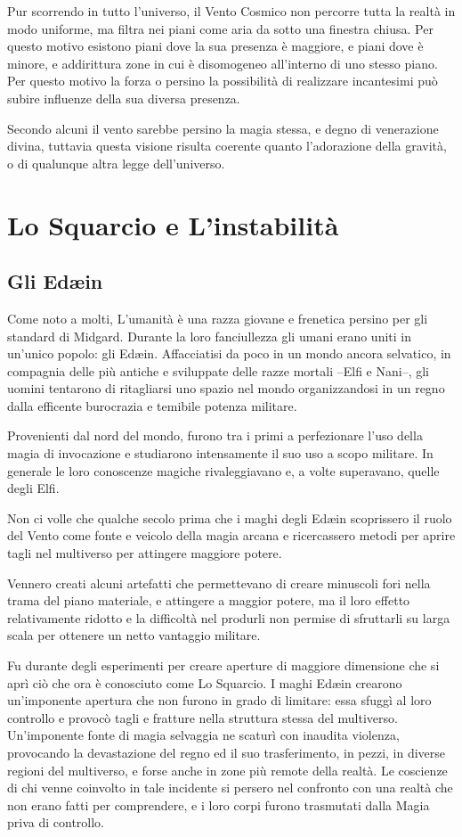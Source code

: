 Pur scorrendo in tutto l’universo, il Vento Cosmico non percorre tutta la realtà in modo uniforme, ma filtra nei piani come aria da sotto una finestra chiusa. Per questo motivo esistono piani dove la sua presenza è maggiore, e piani dove è minore, e addirittura zone in cui è disomogeneo all’interno di uno stesso piano.
Per questo motivo la forza o persino la possibilità di realizzare incantesimi può subire influenze della sua diversa presenza.

Secondo alcuni il vento sarebbe persino la magia stessa, e degno di venerazione divina, tuttavia questa visione risulta coerente quanto l’adorazione della gravità, o di qualunque altra legge dell’universo.

\section{Lo Squarcio e L'instabilità}
\subsection{Gli Edæin}

Come noto a molti, L'umanità è una razza giovane e frenetica persino per gli standard di Midgard. Durante la loro fanciullezza gli umani erano uniti in un'unico popolo: gli Edæin.
Affacciatisi da poco in un mondo ancora selvatico, in compagnia delle più antiche e sviluppate delle razze mortali --Elfi e Nani--, gli uomini tentarono di ritagliarsi uno spazio nel mondo organizzandosi in un regno dalla efficente burocrazia e temibile potenza militare.

Provenienti dal nord del mondo, furono tra i primi a perfezionare l'uso della magia di invocazione e studiarono intensamente il suo uso a scopo militare. In generale le loro conoscenze magiche rivaleggiavano e, a volte superavano, quelle degli Elfi.

Non ci volle che qualche secolo prima che i maghi degli Edæin scoprissero il ruolo del Vento come fonte e veicolo della magia arcana e ricercassero metodi per aprire tagli nel multiverso per attingere maggiore potere.

Vennero creati alcuni artefatti che permettevano di creare minuscoli fori nella trama del piano materiale, e attingere a maggior potere, ma il loro effetto relativamente ridotto e la difficoltà nel produrli non permise di sfruttarli su larga scala per ottenere un netto vantaggio militare.

Fu durante degli esperimenti per creare aperture di maggiore dimensione che si aprì ciò che ora è conosciuto come Lo Squarcio. I maghi Edæin crearono un'imponente apertura che non furono in grado di limitare: essa sfuggì al loro controllo e provocò tagli e fratture nella struttura stessa del multiverso.
Un'imponente fonte di magia selvaggia ne scaturì con inaudita violenza, provocando la devastazione del regno ed il suo trasferimento, in pezzi, in diverse regioni del multiverso, e forse anche in zone più remote della realtà. Le coscienze di chi venne coinvolto in tale incidente si persero nel confronto con una realtà che non erano fatti per comprendere, e i loro corpi furono trasmutati dalla Magia priva di controllo.

